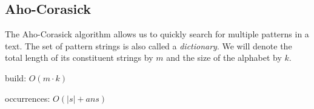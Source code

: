 \subsection{Aho-Corasick}

The Aho-Corasick algorithm allows us to quickly search for multiple patterns in a text. The set of pattern strings is also called a \textit{dictionary}. We will denote the total length of its constituent strings by $m$ and the size of the alphabet by $k$.

build: $O(m \cdot k)$

occurrences: $O(|s| + ans)$
